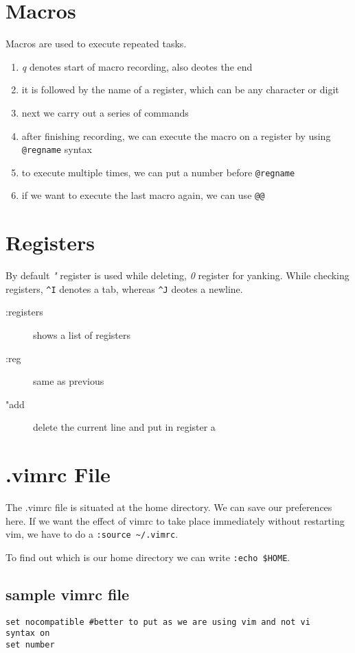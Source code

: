 \documentclass[a4paper, 12pt]{article}
\begin{document}
\section{Macros}
Macros are used to execute repeated tasks.
\begin{enumerate}
	\item \emph{q} denotes start of macro recording, also deotes the end	
	\item it is followed by the name of a register, which can be any character or digit
	\item next we carry out a series of commands
	\item after finishing recording, we can execute the macro on a register by using \verb|@regname| syntax
	\item to execute multiple times, we can put a number before \verb|@regname|
	\item if we want to execute the last macro again, we can use \verb|@@|
\end{enumerate}

\section{Registers}
By default \emph{"} register is used while deleting, \emph{0} register for yanking. While checking registers, \verb|^I| denotes a tab, whereas \verb|^J| deotes a newline.
\begin{description}
	\item[:registers] shows a list of registers	
	\item[:reg] same as previous
	\item["add] delete the current line and put in register a
\end{description}

\section{.vimrc File}
The .vimrc file is situated at the home directory. We can save our preferences here. If we want the effect of vimrc to take place immediately without restarting vim, we have to do a \verb|:source ~/.vimrc|.

To find out which is our home directory we can write \verb|:echo $HOME|.

\subsection{sample vimrc file}
\begin{verbatim}
set nocompatible #better to put as we are using vim and not vi
syntax on
set number
\end{verbatim}
\end{document}
